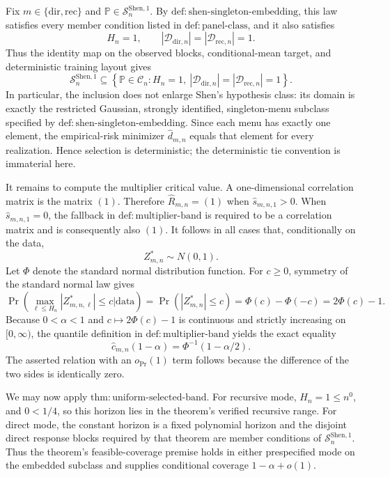 Fix \(m\in\{\mathrm{dir},\mathrm{rec}\}\) and \(\mathbb P\in\mathcal S_n^{\mathrm{Shen},1}\).  By \(\mathrm{def{:}shen\mbox{-}singleton\mbox{-}embedding}\), this law satisfies every member condition listed in \(\mathrm{def{:}panel\mbox{-}class}\), and it also satisfies
\[
 H_n=1,
 \qquad
 |\mathcal D_{\mathrm{dir},n}|=|\mathcal D_{\mathrm{rec},n}|=1.
\]
Thus the identity map on the observed blocks, conditional-mean target, and deterministic training layout gives
\[
 \mathcal S_n^{\mathrm{Shen},1}
 \subseteq
 \left\{\mathbb P\in\mathcal C_n:
 H_n=1,\ |
 \mathcal D_{\mathrm{dir},n}|=|
 \mathcal D_{\mathrm{rec},n}|=1\right\}.
\]
In particular, the inclusion does not enlarge Shen's hypothesis class: its domain is exactly the restricted Gaussian, strongly identified, singleton-menu subclass specified by \(\mathrm{def{:}shen\mbox{-}singleton\mbox{-}embedding}\).  Since each menu has exactly one element, the empirical-risk minimizer \(\widehat d_{m,n}\) equals that element for every realization.  Hence selection is deterministic; the deterministic tie convention is immaterial here.

It remains to compute the multiplier critical value.  A one-dimensional correlation matrix is the matrix \((1)\).  Therefore \(\widehat R_{m,n}=(1)\) when \(\widehat s_{m,n,1}>0\).  When \(\widehat s_{m,n,1}=0\), the fallback in \(\mathrm{def{:}multiplier\mbox{-}band}\) is required to be a correlation matrix and is consequently also \((1)\).  It follows in all cases that, conditionally on the data,
\[
 Z_{m,n}^{\ast}\sim N(0,1).
\]
Let \(\Phi\) denote the standard normal distribution function.  For \(c\geq0\), symmetry of the standard normal law gives
\[
 \Pr\!\left(
 \max_{\ell\leq H_n}|Z_{m,n,\ell}^{\ast}|\leq c
 \mathrel{\big|}\mathrm{data}
 \right)
 =\Pr(|Z_{m,n}^{\ast}|\leq c)
 =\Phi(c)-\Phi(-c)
 =2\Phi(c)-1.
\]
Because \(0<\alpha<1\) and \(c\mapsto2\Phi(c)-1\) is continuous and strictly increasing on \([0,\infty)\), the quantile definition in \(\mathrm{def{:}multiplier\mbox{-}band}\) yields the exact equality
\[
 \widehat c_{m,n}(1-\alpha)
 =\Phi^{-1}(1-\alpha/2).
\]
The asserted relation with an \(o_{\Pr}(1)\) term follows because the difference of the two sides is identically zero.

We may now apply \(\mathrm{thm{:}uniform\mbox{-}selected\mbox{-}band}\).  For recursive mode, \(H_n=1\leq n^0\), and \(0<1/4\), so this horizon lies in the theorem's verified recursive range.  For direct mode, the constant horizon is a fixed polynomial horizon and the disjoint direct response blocks required by that theorem are member conditions of \(\mathcal S_n^{\mathrm{Shen},1}\).  Thus the theorem's feasible-coverage premise holds in either prespecified mode on the embedded subclass and supplies conditional coverage \(1-\alpha+o(1)\).

